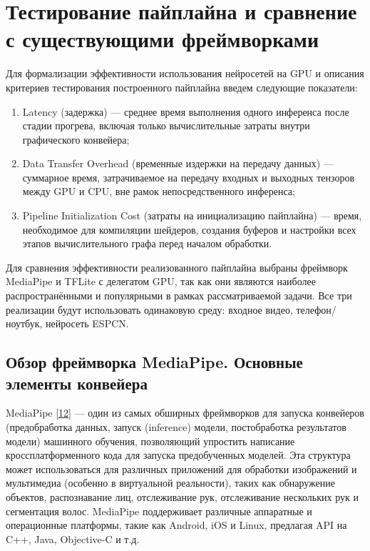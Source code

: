 \documentclass[a4paper,14pt]{extreport}
\begin{document}
    \chapter{Тестирование пайплайна и сравнение с существующими фреймворками}
        Для формализации эффективности использования нейросетей на GPU и описания критериев тестирования построенного пайплайна введем следующие показатели:
        \begin{enumerate}
            \item Latency (задержка) — среднее время выполнения одного инференса после стадии прогрева, включая только вычислительные затраты внутри графического конвейера;
            \item Data Transfer Overhead (временные издержки на передачу данных) — суммарное время, затрачиваемое на передачу входных и выходных тензоров между GPU и CPU, вне рамок непосредственного инференса;
            \item Pipeline Initialization Cost (затраты на инициализацию пайплайна) — время, необходимое для компиляции шейдеров, создания буферов и настройки всех этапов вычислительного графа перед началом обработки.
        \end{enumerate}

        Для сравнения эффективности реализованного пайплайна выбраны фреймворк MediaPipe и TFLite с делегатом GPU, так как они являются наиболее распространёнными и популярными в рамках рассматриваемой задачи. Все три реализации будут использовать одинаковую среду: входное видео, телефон/ноутбук, нейросеть ESPCN.

        \section{Обзор фреймворка MediaPipe. Основные элементы конвейера}
        MediaPipe \hyperlink{[12]}{[12]} — один из самых обширных фреймворков для запуска конвейеров (предобработка данных, запуск (inference) модели, постобработка результатов модели) машинного обучения, позволяющий упростить написание кроссплатформенного кода для запуска предобученных моделей. Эта структура может использоваться для различных приложений для обработки изображений и мультимедиа (особенно в виртуальной реальности), таких как обнаружение объектов, распознавание лиц, отслеживание рук, отслеживание нескольких рук и сегментация волос. MediaPipe поддерживает различные аппаратные и операционные платформы, такие как Android, iOS и Linux, предлагая API на C++, Java, Objective-C и т.д.
        
\end{document}
